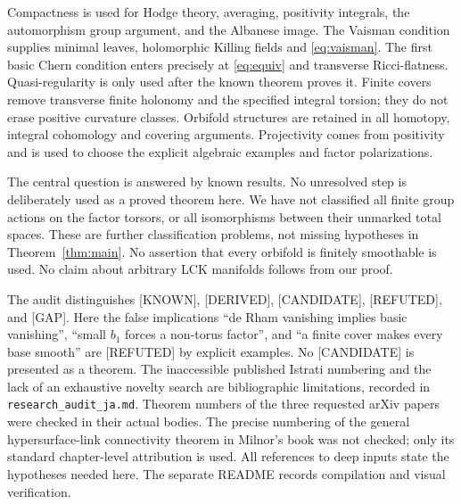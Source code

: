 \documentclass[12pt]{amsart}
\theoremstyle{definition}
\theoremstyle{remark}
\numberwithin{equation}{section}
\newcommand{\AIstatus}[1]{\textnormal{\textsf{[#1]}}}
\begin{document}
Compactness is used for Hodge theory, averaging, positivity integrals,
the automorphism group argument, and the Albanese image. The Vaisman
condition supplies minimal leaves, holomorphic Killing fields and
\eqref{eq:vaisman}. The first basic Chern condition enters precisely
at \eqref{eq:equiv} and transverse Ricci-flatness. Quasi-regularity is
only used after the known theorem proves it. Finite covers remove
transverse finite holonomy and the specified integral torsion; they do
not erase positive curvature classes. Orbifold structures are retained
in all homotopy, integral cohomology and covering arguments. Projectivity
comes from positivity and is used to choose the explicit algebraic
examples and factor polarizations.

The central question is answered by known results. No unresolved step
is deliberately used as a proved theorem here. We have not classified
all finite group actions on the factor torsors, or all isomorphisms
between their unmarked total spaces. These are further classification
problems, not missing hypotheses in Theorem~\ref{thm:main}.
No assertion that every orbifold is finitely smoothable is used.
No claim about arbitrary LCK manifolds follows from our proof.

The audit distinguishes \AIstatus{KNOWN}, \AIstatus{DERIVED},
\AIstatus{CANDIDATE}, \AIstatus{REFUTED}, and \AIstatus{GAP}.
Here the false implications ``de Rham vanishing implies basic
vanishing'', ``small $b_1$ forces a non-torus factor'', and ``a finite
cover makes every base smooth'' are \AIstatus{REFUTED} by explicit
examples. No \AIstatus{CANDIDATE} is presented as a theorem.
The inaccessible published Istrati numbering and the lack of an
exhaustive novelty search are bibliographic limitations, recorded in
\texttt{research\_audit\_ja.md}. Theorem numbers of the three requested
arXiv papers were checked in their actual bodies. The precise numbering
of the general hypersurface-link connectivity theorem in Milnor's
book was not checked; only its standard chapter-level attribution is
used. All references to deep inputs state the hypotheses needed here.
The separate README records compilation and visual verification.
\end{document}
